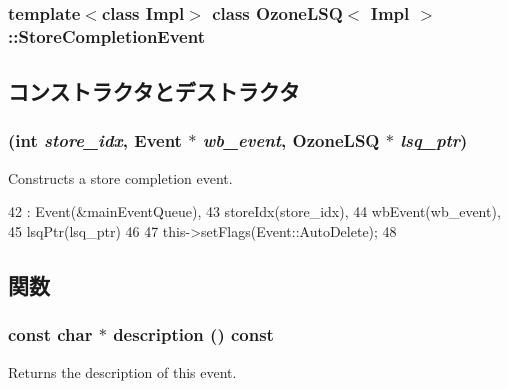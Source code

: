 \subsubsection*{template$<$class Impl$>$ class OzoneLSQ$<$ Impl $>$::StoreCompletionEvent}



\subsection{コンストラクタとデストラクタ}
\hypertarget{classOzoneLSQ_1_1StoreCompletionEvent_a1f921e0941fd6fe4715ce8a68e1354a2}{
\subsubsection[{StoreCompletionEvent}]{ (int {\em store\_\-idx}, \/  {\bf Event} $\ast$ {\em wb\_\-event}, \/  {\bf OzoneLSQ} $\ast$ {\em lsq\_\-ptr})}}
\label{classOzoneLSQ_1_1StoreCompletionEvent_a1f921e0941fd6fe4715ce8a68e1354a2}
Constructs a store completion event. 


\begin{DoxyCode}
42     : Event(&mainEventQueue),
43       storeIdx(store_idx),
44       wbEvent(wb_event),
45       lsqPtr(lsq_ptr)
46 {
47     this->setFlags(Event::AutoDelete);
48 }
\end{DoxyCode}


\subsection{関数}
\hypertarget{classOzoneLSQ_1_1StoreCompletionEvent_a5a14fe478e2393ff51f02e9b7be27e00}{
\subsubsection[{description}]{\setlength{\rightskip}{0pt plus 5cm}const char $\ast$ description () const}}
\label{classOzoneLSQ_1_1StoreCompletionEvent_a5a14fe478e2393ff51f02e9b7be27e00}
Returns the description of this event. 


